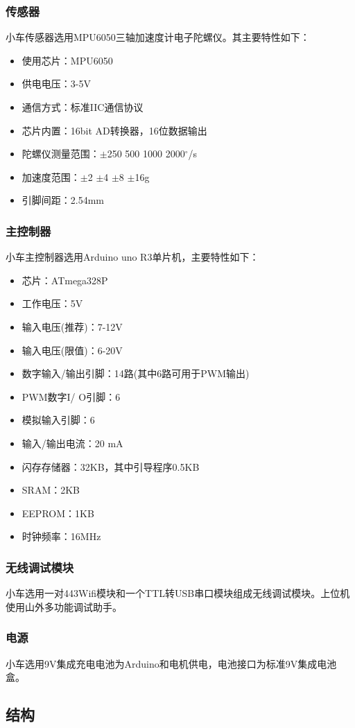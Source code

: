 \documentclass[a4paper]{ctexart}
\begin{document}
\begin{spacing}{1.5}
\subsubsection{传感器}
小车传感器选用MPU6050三轴加速度计电子陀螺仪。其主要特性如下：
\begin{itemize}
	\item 使用芯片：MPU6050
	\item 供电电压：3-5V
	\item 通信方式：标准IIC通信协议
	\item 芯片内置：16bit AD转换器，16位数据输出
	\item 陀螺仪测量范围：$\pm$250 500 1000 2000$^\circ$/s
	\item 加速度范围：$\pm$2 $\pm$4 $\pm$8 $\pm$16g
	\item 引脚间距：2.54mm
\end{itemize}
\subsubsection{主控制器}
小车主控制器选用Arduino uno R3单片机，主要特性如下：
\begin{itemize}
	\item 芯片：ATmega328P
	\item 工作电压：5V
	\item 输入电压(推荐)：7-12V
	\item 输入电压(限值)：6-20V
	\item 数字输入/输出引脚：14路(其中6路可用于PWM输出)
	\item PWM数字I/ O引脚：6 
	\item 模拟输入引脚：6
	\item 输入/输出电流：20 mA
	\item 闪存存储器：32KB，其中引导程序0.5KB
	\item SRAM：2KB
	\item EEPROM：1KB
	\item 时钟频率：16MHz
\end{itemize}
\subsubsection{无线调试模块}
小车选用一对443Wifi模块和一个TTL转USB串口模块组成无线调试模块。上位机使用山外多功能调试助手。
\subsubsection{电源}
小车选用9V集成充电电池为Arduino和电机供电，电池接口为标准9V集成电池盒。
\subsection{结构}

\end{spacing}
\end{document}
